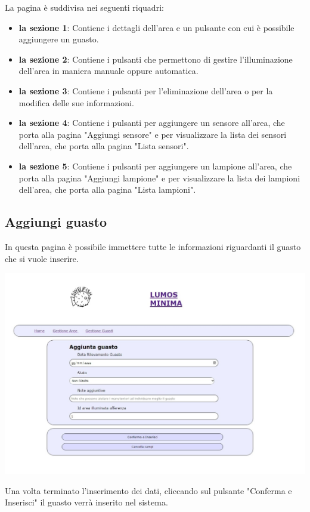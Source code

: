 \documentclass[9pt]{article}
\begin{document}
La pagina è suddivisa nei seguenti riquadri:
\begin{itemize}
	\item \textbf{la sezione 1}: Contiene i dettagli dell'area e un pulsante con cui è possibile aggiungere un guasto.
	\item \textbf{la sezione 2}: Contiene i pulsanti che permettono di gestire l'illuminazione dell'area in maniera manuale oppure automatica.
	\item \textbf{la sezione 3}: Contiene i pulsanti per l'eliminazione dell'area o per la modifica delle sue informazioni.
	\item \textbf{la sezione 4}: Contiene i pulsanti per aggiungere un sensore all'area, che porta alla pagina "Aggiungi sensore" e per visualizzare la lista dei sensori dell'area, che porta alla pagina "Lista sensori".
	\item \textbf{la sezione 5}: Contiene i pulsanti per aggiungere un lampione all'area, che porta alla pagina "Aggiungi lampione" e per visualizzare la lista dei lampioni dell'area, che porta alla pagina "Lista lampioni".
\end{itemize}

\subsection{Aggiungi guasto}
In questa pagina è possibile immettere tutte le informazioni riguardanti il guasto che si vuole inserire.

\begin{center}
	\includegraphics[scale=0.3]{Aggiungi_guasto.png}
\end{center}

Una volta terminato l'inserimento dei dati, cliccando sul pulsante "Conferma e Inserisci"
il guasto verrà inserito nel sistema.
\end{document}
